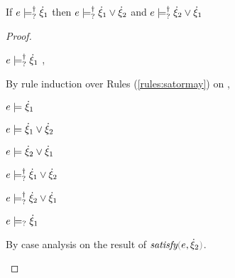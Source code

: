 \begin{lemma}
  \label{lem:satormay-or}
  If $e \models_{?}^{\dag} \dot{\xi}_1$ then $e \models_{?}^{\dag} \dot{\xi}_1 \vee \dot{\xi}_2$ and
$e \models_{?}^{\dag} \dot{\xi}_2 \vee \dot{\xi}_1$
\end{lemma}
\begin{proof}
\begin{pfsteps*}
\item $e \models_{?}^{\dag} \dot{\xi}_1$  ,
\end{pfsteps*}
By rule induction over Rules (\ref{rules:satormay}) on ,
\begin{byCases}

\item[\text{(\ref{rule:CSMSSat})}]
  \begin{pfsteps*}
  \item $e \models \dot{\xi}_1$  
  \item $e \models \dot{\xi}_1 \vee \dot{\xi}_2$  
  \item $e \models \dot{\xi}_2 \vee \dot{\xi}_1$  
  \item $e \models_{?}^{\dag} \dot{\xi}_1 \vee \dot{\xi}_2$ 
  \item $e \models_{?}^{\dag} \dot{\xi}_2 \vee \dot{\xi}_1$ 
  \end{pfsteps*}


\item[\text{(\ref{rule:CSMSMay})}]
  \begin{pfsteps*}
  \item $e \models_{?} \dot{\xi}_1$  
  \end{pfsteps*}
  By case analysis on the result of $\fsatisfy{e}{\hxi_2}$.
  \begin{byCases}


\end{byCases}
\end{byCases}
\end{proof}
